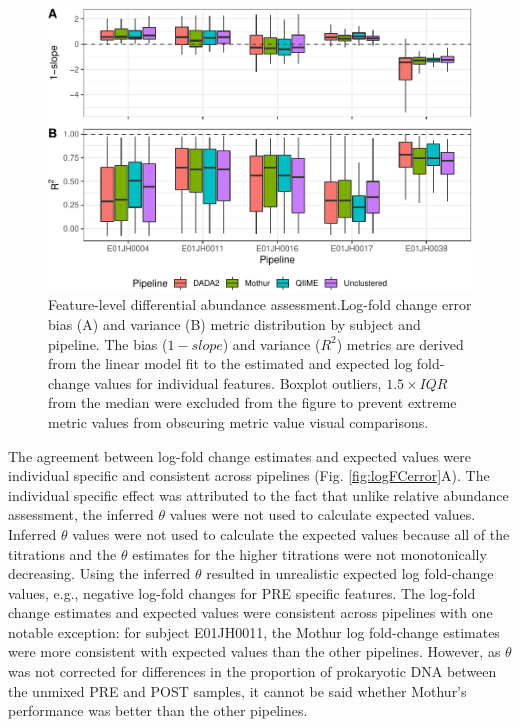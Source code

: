 \documentclass{bmcart}
\begin{document}
\begin{figure}
\centering
\includegraphics{logFcErrorMetrics-1.pdf}
\caption{\label{fig:logFcErrorMetrics}Feature-level differential abundance assessment.Log-fold change error
bias (A) and variance (B) metric distribution by subject and pipeline.
The bias (\(1 - slope\)) and variance (\(R^2\)) metrics are derived from
the linear model fit to the estimated and expected log fold-change
values for individual features. Boxplot outliers, \(1.5\times IQR\) from
the median were excluded from the figure to prevent extreme metric
values from obscuring metric value visual comparisons.}
\end{figure}

The agreement between log-fold change estimates and expected values were
individual specific and consistent across pipelines (Fig.
\ref{fig:logFCerror}A). The individual specific effect was attributed to
the fact that unlike relative abundance assessment, the inferred
\(\theta\) values were not used to calculate expected values. Inferred
\(\theta\) values were not used to calculate the expected values because
all of the titrations and the \(\theta\) estimates for the higher
titrations were not monotonically decreasing.
Using the inferred \(\theta\) resulted in unrealistic expected log fold-change values, e.g.,
negative log-fold changes for PRE specific features. The log-fold change
estimates and expected values were consistent across pipelines with one
notable exception: for subject E01JH0011, the Mothur log fold-change estimates
were more consistent with expected values than the other pipelines.
However, as \(\theta\) was not corrected for differences in the
proportion of prokaryotic DNA between the unmixed PRE and POST samples,
it cannot be said whether Mothur's performance was better than the other
pipelines.
\end{document}
